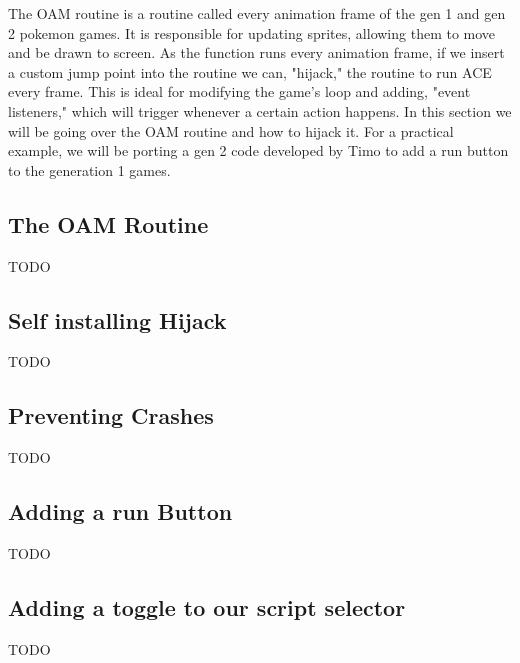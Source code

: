 \documentclass[../main.tex]{subfile}
\begin{document}
    The OAM routine is a routine called every animation frame of the gen 1 and gen 2 pokemon games.  It is responsible for updating sprites, allowing them to move and be drawn to screen.  As the function runs every animation frame, if we insert a custom jump point into the routine we can, "hijack," the routine to run ACE every frame.  This is ideal for modifying the game's loop and adding, "event listeners," which will trigger whenever a certain action happens.  In this section we will be going over the OAM routine and how to hijack it.  For a practical example, we will be porting a gen 2 code developed by Timo to add a run button to the generation 1 games.

    \subsection{The OAM Routine}
    TODO

    \subsection{Self installing Hijack}
    TODO

    \subsection{Preventing Crashes}
    TODO

    \subsection{Adding a run Button}
    TODO

    \subsection{Adding a toggle to our script selector}
    TODO
\end{document}

